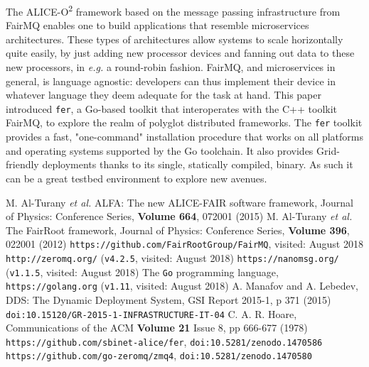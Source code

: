 \documentclass{webofc}
\begin{document}
The ALICE-O\textsuperscript{2} framework based on the message passing infrastructure from FairMQ enables one to build applications that resemble microservices architectures.
These types of architectures allow systems to scale horizontally quite easily, by just adding new processor devices and fanning out data to these new processors, in \emph{e.g.} a round-robin fashion.
FairMQ, and microservices in general, is language agnostic: developers can thus implement their device in whatever language they deem adequate for the task at hand.
This paper introduced \texttt{fer}, a Go-based toolkit that interoperates with the C++ toolkit FairMQ, to explore the realm of polyglot distributed frameworks.
The \texttt{fer} toolkit provides a fast, "one-command" installation procedure that works on all platforms and operating systems supported by the Go toolchain.
It also provides Grid-friendly deployments thanks to its single, statically compiled, binary.
As such it can be a great testbed environment to explore new avenues.


\begin{thebibliography}{}

 M. Al-Turany \emph{et al.} ALFA: The new ALICE-FAIR software framework, Journal of Physics: Conference Series, \textbf{Volume 664}, 072001 (2015)
 M. Al-Turany \emph{et al.} The FairRoot framework, Journal of Physics: Conference Series, \textbf{Volume 396}, 022001 (2012)
 \texttt{https://github.com/FairRootGroup/FairMQ}, visited: August 2018
 \texttt{http://zeromq.org/} (\texttt{v4.2.5}, visited: August 2018)
 \texttt{https://nanomsg.org/} (\texttt{v1.1.5}, visited: August 2018)
 The \texttt{Go} programming language, \texttt{https://golang.org} (\texttt{v1.11}, visited: August 2018)
 A. Manafov and A. Lebedev, DDS: The Dynamic Deployment System, GSI Report 2015-1, p 371 (2015) \texttt{doi:10.15120/GR-2015-1-INFRASTRUCTURE-IT-04}
 C. A. R. Hoare, Communications of the ACM \textbf{Volume 21} Issue 8, pp 666-677 (1978)
 \texttt{https://github.com/sbinet-alice/fer}, \texttt{doi:10.5281/zenodo.1470586}
 \texttt{https://github.com/go-zeromq/zmq4}, \texttt{doi:10.5281/zenodo.1470580}

\end{thebibliography}
\end{document}

